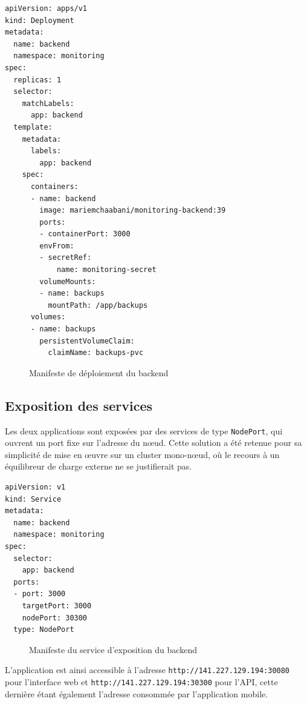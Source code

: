 \begin{lrbox}{\manifbox}
\begin{minipage}{0.88\textwidth}
\begin{verbatim}
apiVersion: apps/v1
kind: Deployment
metadata:
  name: backend
  namespace: monitoring
spec:
  replicas: 1
  selector:
    matchLabels:
      app: backend
  template:
    metadata:
      labels:
        app: backend
    spec:
      containers:
      - name: backend
        image: mariemchaabani/monitoring-backend:39
        ports:
        - containerPort: 3000
        envFrom:
        - secretRef:
            name: monitoring-secret
        volumeMounts:
        - name: backups
          mountPath: /app/backups
      volumes:
      - name: backups
        persistentVolumeClaim:
          claimName: backups-pvc
\end{verbatim}
\end{minipage}
\end{lrbox}
\begin{figure}[H]
\centering
\fbox{\usebox{\manifbox}}
\caption{Manifeste de déploiement du backend}
\label{fig:manifest-back}
\end{figure}

\subsection{Exposition des services}
Les deux applications sont exposées par des services de type \texttt{NodePort}, qui
ouvrent un port fixe sur l'adresse du n\oe ud. Cette solution a été retenue pour sa
simplicité de mise en \oe uvre sur un cluster mono-n\oe ud, où le recours à un
équilibreur de charge externe ne se justifierait pas.

\begin{lrbox}{\manifbox}
\begin{minipage}{0.88\textwidth}
\begin{verbatim}
apiVersion: v1
kind: Service
metadata:
  name: backend
  namespace: monitoring
spec:
  selector:
    app: backend
  ports:
  - port: 3000
    targetPort: 3000
    nodePort: 30300
  type: NodePort
\end{verbatim}
\end{minipage}
\end{lrbox}
\begin{figure}[H]
\centering
\fbox{\usebox{\manifbox}}
\caption{Manifeste du service d'exposition du backend}
\label{fig:manifest-svc}
\end{figure}

L'application est ainsi accessible à l'adresse \texttt{http://}\allowbreak\texttt{141.227.129.194:30080}
pour l'interface web et \texttt{http://}\allowbreak\texttt{141.227.129.194:30300} pour l'API, cette dernière
étant également l'adresse consommée par l'application mobile.

